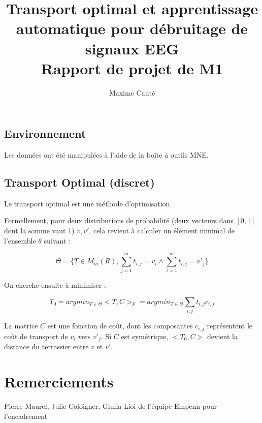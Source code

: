 \documentclass[a4paper]{article}
\begin{document}
\title{Transport optimal et apprentissage automatique pour débruitage de signaux EEG \\
			Rapport de projet de M1}
\author{Maxime Cauté}


\maketitle

\subsection{Environnement}

Les données ont été manipulées à l'aide de la boîte à outils MNE. %

\subsection{Transport Optimal (discret)}

Le transport optimal est une méthode d'optimisation.

Formellement, pour deux distributions de probabilité (deux vecteurs dans $[0,1]$ dont la somme vaut 1) $v, v'$, cela revient à calculer un élément minimal de l'ensemble $\theta$ suivant :

	$$ \Theta = \{ T \in M_m(R), \sum_{j=1}^m t_{i,j} = v_i \wedge \sum_{i=1}^m t_{i,j} = v'_j\}$$

On cherche ensuite à minimiser :

	$$ T_0 = argmin_{T \in \Theta} <T, C>_F = argmin_{T \in \Theta} \sum_{i,j} t_{i,j}c_{i,j} $$

La matrice $C$ est une fonction de coût, dont les composantes $c_{i,j}$ représentent le coût de transport de $v_i$ vers $v'_j$. Si $C$ est symétrique, $<T_0,C>$ devient la distance du terrassier entre $v$ et $v'$.




\section*{Remerciements}

Pierre Maurel, Julie Coloigner, Giulia Lioi de l'équipe Empenn pour l'encadrement
\end{document}
